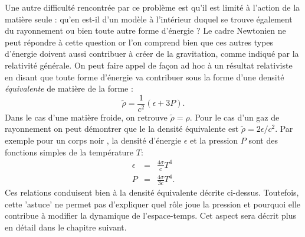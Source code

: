 Une autre difficulté rencontrée par ce problème est qu'il est limité à l'action de la matière seule : qu'en est-il d'un modèle à l'intérieur duquel se trouve également du rayonnement ou bien toute autre forme d'énergie ? Le cadre Newtonien ne peut répondre à cette question or l'on comprend bien que ces autres types d'énergie doivent aussi contribuer à créer de la gravitation, comme indiqué par la relativité générale. On peut faire appel de façon ad hoc à un résultat relativiste en disant que toute forme d'énergie va contribuer sous la forme d'une densité \textit{équivalente} de matière de la forme :
\begin{equation}
\tilde \rho= \frac{1}{c^2}(\epsilon + 3P).
\end{equation}
Dans le cas d'une matière froide, on retrouve $\tilde \rho =\rho$. Pour le cas d'un gaz de rayonnement on peut démontrer que le la densité équivalente est $\tilde \rho =2\epsilon/c^2$. Par exemple pour un corps noir , la densité d'énergie $\epsilon$ et la pression $P$ sont des fonctions simples de la température  $T$:
\begin{eqnarray}
\epsilon&=&\frac{4\sigma}{c} T^4\\
P&=&\frac{4\sigma}{3c} T^4.
\end{eqnarray}
Ces relations conduisent bien à la densité équivalente décrite ci-dessus. Toutefois, cette 'astuce' ne permet pas d'expliquer quel rôle joue la pression et pourquoi elle contribue à modifier la dynamique de l'espace-temps. Cet aspect sera décrit plus en détail dans le chapitre suivant.

